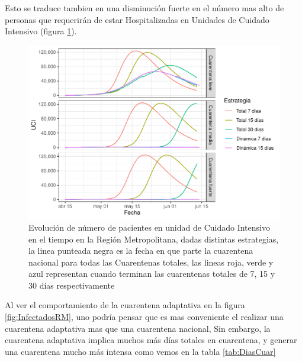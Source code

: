 \documentclass[]{article}
\begin{document}
Esto se traduce tambien en una disminución fuerte en el número mas alto de personas que requerirán de estar Hospitalizadas en Unidades de Cuidado Intensivo (figura \ref{fig:UCIRM}).

\begin{figure}
\centering
\includegraphics{Informe_Mesa_2020_04_16_files/figure-latex/UCIRM-1.pdf}
\caption{\label{fig:UCIRM}Evolución de número de pacientes en unidad de Cuidado Intensivo en el tiempo en la Región Metropolitana, dadas distintas estrategias, la linea punteada negra es la fecha en que parte la cuarentena nacional para todas las Cuarentenas totales, las lineas roja, verde y azul representan cuando terminan las cuarentenas totales de 7, 15 y 30 días respectivamente}
\end{figure}

Al ver el comportamiento de la cuarentena adaptativa en la figura \ref{fig:InfectadosRM}, uno podría pensar que es mas conveniente el realizar una cuarentena adaptativa mas que una cuarentena nacional, Sin embargo, la cuarentena adaptativa implica muchos más días totales en cuarentena, y generar una cuarentena mucho más intensa como vemos en la tabla \ref{tab:DiasCuar}
\end{document}
